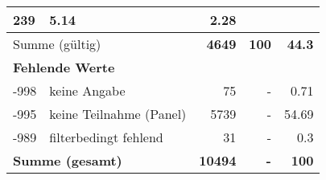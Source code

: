 \begin{longtable}{lXrrr}
       \num{239} &
       \num[round-mode=places,round-precision=2]{5,14} &
         \num[round-mode=places,round-precision=2]{2,28} \\
     \midrule
     \multicolumn{2}{l}{Summe (gültig)} &
       \textbf{\num{4649}} &
     \textbf{100} &
       \textbf{\num[round-mode=places,round-precision=2]{44,3}} \\
     \multicolumn{5}{l}{\textbf{Fehlende Werte}}\\
       -998 &
       keine Angabe &
         \num{75} &
        - &
         \num[round-mode=places,round-precision=2]{0,71} \\
       -995 &
       keine Teilnahme (Panel) &
         \num{5739} &
        - &
         \num[round-mode=places,round-precision=2]{54,69} \\
       -989 &
       filterbedingt fehlend &
         \num{31} &
        - &
         \num[round-mode=places,round-precision=2]{0,3} \\
     \midrule
     \multicolumn{2}{l}{\textbf{Summe (gesamt)}} &
          \textbf{\num{10494}} &
        \textbf{-} &
        \textbf{100} \\
     \bottomrule
     \end{longtable}
     
